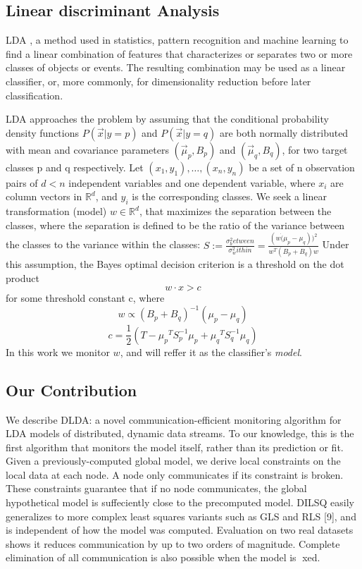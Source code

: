 \documentclass[11pt,twocolumn,varwidth=true,a4paper,fleqn]{article}
\begin{document}
\subsection{Linear discriminant Analysis}
\par LDA \cite{fisher1936use}, a method used in statistics, 
pattern recognition and machine learning to find a linear combination of features 
that characterizes or separates two or more classes of objects or events. 
The resulting combination may be used as a linear classifier, or, 
more commonly, for dimensionality reduction before later classification.
\\\par LDA approaches the problem by assuming that the conditional probability
density functions $P(\vec x|y=p)$ and $P(\vec x|y=q)$ are both normally distributed with 
mean and covariance parameters $\left(\vec \mu_p, B_p\right)$ and 
$\left(\vec \mu_q, B_q\right)$, for two target classes p and q respectively.
Let ${(x_1,y_1),\ldots,(x_n,y_n)}$ be a set of n observation pairs
of $d < n$ independent variables and one dependent variable,
where $x_i$ are column vectors in $\mathbb{R}^d$, and $y_i$ is the
corresponding classes. 
We seek a linear transformation (model) $w \in \mathbb{R}^d $,
that maximizes the separation between the classes, where the separation is
defined to be the ratio of the variance between the classes to the variance
within the classes:
$S := \frac{\sigma^2_between}{\sigma^2_within} = \frac{(w \dot (\mu_p -
\mu_q))^2}{w^T(B_p+B_q)w}$
Under this assumption, the Bayes optimal decision criterion is a threshold on the 
dot product
\begin{equation*} \label{eq:decision}
w \cdot x > c
\end{equation*}
for some threshold constant c, where
\begin{equation} \label{eq:w}
w \propto (B_p+B_q)^{-1}(\mu_p - \mu_q)
\end{equation}
\begin{equation} \label{eq:c}
c = \frac{1}{2}(T-{\mu_p}^T S_p^{-1} {\mu_p}+{\mu_q}^T S_q^{-1} {\mu_q})
\end{equation}
In this work we monitor $w$, and will reffer it as the
classifier's \textit{model}.
\subsection{Our Contribution}

We describe DLDA: a novel communication-efficient monitoring
algorithm for LDA models of distributed, dynamic data streams. 
To our knowledge, this is the first algorithm that monitors the model itself, 
rather than its prediction or fit. Given a previously-computed global model, 
we derive local constraints on the local data at each node. A node only communicates
if its constraint is broken. These constraints guarantee that
if no node communicates, the global hypothetical model is
suffeciently close to the precomputed model.
DILSQ easily generalizes to more complex least squares
variants such as GLS and RLS [9], and is independent of how
the model was computed. Evaluation on two real datasets
shows it reduces communication by up to two orders of
magnitude. Complete elimination of all communication is
also possible when the model is xed.
\end{document}
